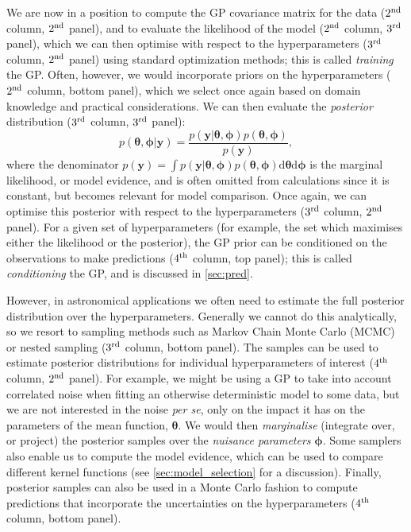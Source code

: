 \documentclass[letterpaper]{ar-1col}
\newcommand{\hyperparams}{\ensuremath{\boldsymbol{\phi}}}
\newcommand{\meanparams}{\ensuremath{\boldsymbol{\theta}}}
\begin{document}
We are now in a position to compute the GP covariance matrix for the data ($2^{\rm nd}$ column, $2^{\rm nd}$ panel), and to evaluate the likelihood of the model ($2^{\rm nd}$ column, $3^{\rm rd}$ panel), which we can then optimise with respect to the hyperparameters ($3^{\rm rd}$ column, $2^{\rm nd}$ panel) using standard optimization methods; this is called \emph{training} the GP. Often, however, we would incorporate priors on the hyperparameters ($2^{\rm nd}$ column, bottom panel), which we select once again based on domain knowledge and practical considerations. We can then evaluate the \emph{posterior} distribution ($3^{\rm rd}$ column, $3^{\rm rd}$ panel):
\begin{equation}
  p(\meanparams,\hyperparams|\mathbf{y})=\frac{p(\mathbf{y}|\meanparams,\hyperparams)p(\meanparams,\hyperparams)}{p(\mathbf{y})},
\end{equation}
where the denominator $p(\mathbf{y})=\int p(\mathbf{y}|\meanparams,\hyperparams)p(\meanparams,\hyperparams) \mathrm{d}\meanparams \mathrm{d}\hyperparams$ is the marginal likelihood, or model evidence, and is often omitted from calculations since it is constant, but becomes relevant for model comparison. Once again, we can optimise this posterior with respect to the hyperparameters ($3^{\rm rd}$ column, $2^{\rm nd}$ panel). For a given set of hyperparameters (for example, the set which maximises either the likelihood or the posterior), the GP prior can be conditioned on the observations to make predictions ($4^{\rm th}$ column, top panel); this is called \emph{conditioning} the GP, and is discussed in \autoref{sec:pred}. 

However, in astronomical applications we often need to estimate the full posterior distribution over the hyperparameters. 
Generally we cannot do this analytically, so we resort to sampling methods such as Markov Chain Monte Carlo (MCMC) or nested sampling ($3^{\rm rd}$ column, bottom panel). The samples can be used to estimate posterior distributions for individual hyperparameters of interest ($4^{\rm th}$ column, $2^{\rm nd}$ panel). For example, we might be using a GP to take into account correlated noise when fitting an otherwise deterministic model to some data, but we are not interested in the noise \emph{per se}, only on the impact it has on the parameters of the mean function, $\meanparams$. We would then \emph{marginalise} (integrate over, or project) the posterior samples over the \emph{nuisance parameters} $\hyperparams$. Some samplers also enable us to compute the model evidence, which can be used to compare different kernel functions (see \autoref{sec:model_selection} for a discussion). Finally,  posterior samples can also be used in a Monte Carlo fashion to compute predictions that incorporate the uncertainties on the hyperparameters ($4^{\rm th}$ column, bottom panel).
\end{document}
